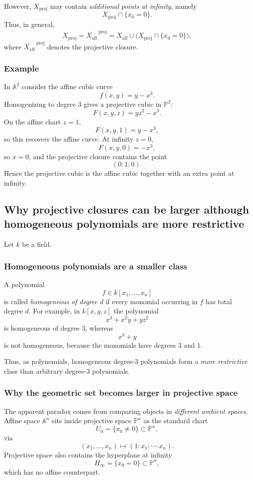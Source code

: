 \documentclass[12pt,a4paper]{article}
\theoremstyle{plain}
\theoremstyle{definition}      %
\begin{document}
However, $X_{\mathrm{proj}}$ may contain \emph{additional points at infinity}, namely
\[
X_{\mathrm{proj}}\cap \{x_0=0\}.
\]
Thus, in general,
\[
X_{\mathrm{proj}}
=
\overline{X_{\mathrm{aff}}}^{\ \mathrm{proj}}
=
X_{\mathrm{aff}}
\cup
\bigl(X_{\mathrm{proj}}\cap \{x_0=0\}\bigr),
\]
where $\overline{X_{\mathrm{aff}}}^{\ \mathrm{proj}}$ denotes the projective closure.

\subsubsection*{Example}

In $\mathbb A^2$ consider the affine cubic curve
\[
f(x,y)=y-x^3.
\]
Homogenizing to degree $3$ gives a projective cubic in $\mathbb P^2$:
\[
F(x,y,z)=yz^2-x^3.
\]
On the affine chart $z=1$,
\[
F(x,y,1)=y-x^3,
\]
so this recovers the affine curve.
At infinity $z=0$,
\[
F(x,y,0)=-x^3,
\]
so $x=0$, and the projective closure contains the point
\[
(0:1:0).
\]
Hence the projective cubic is the affine cubic together with an extra point at infinity.


\subsection*{Why projective closures can be larger although homogeneous polynomials are more restrictive}

Let $k$ be a field.

\subsubsection*{Homogeneous polynomials are a smaller class}

A polynomial
\[
f\in k[x_1,\dots,x_n]
\]
is called \emph{homogeneous of degree $d$} if every monomial occurring in $f$ has total degree $d$.
For example, in $k[x,y,z]$ the polynomial
\[
x^3+x^2y+yz^2
\]
is homogeneous of degree $3$, whereas
\[
x^3+y
\]
is not homogeneous, because the monomials have degrees $3$ and $1$.

Thus, as polynomials, homogeneous degree-$3$ polynomials form a \emph{more restrictive} class than arbitrary degree-$3$ polynomials.

\subsubsection*{Why the geometric set becomes larger in projective space}

The apparent paradox comes from comparing objects in \emph{different ambient spaces}.
Affine space $\mathbb A^n$ sits inside projective space $\mathbb P^n$ as the standard chart
\[
U_0=\{x_0\neq 0\}\subset \mathbb P^n,
\]
via
\[
(x_1,\dots,x_n)\longmapsto (1:x_1:\cdots:x_n).
\]
Projective space also contains the hyperplane at infinity
\[
H_\infty=\{x_0=0\}\subset \mathbb P^n,
\]
which has no affine counterpart.
\end{document}
